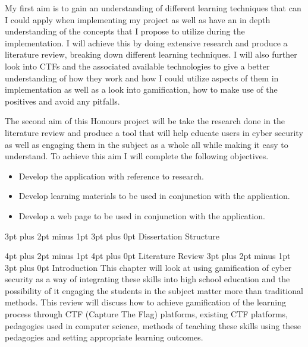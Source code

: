 \documentclass[12pt,a4paper]{article}
\makeatletter
\renewcommand\subsection{\@startsection {subsection}{1}{2mm} %
                               {3pt plus 2pt minus 1pt} %
                               {3pt plus 0pt} %
                               {\normalfont\bfseries}}
\renewcommand\section{\@startsection {section}{1}{0mm} %
                               {4pt plus 2pt minus 1pt} %
                               {4pt plus 0pt} %
                               {\bfseries}}
\makeatother
\begin{document}
My first aim is to gain an understanding of different learning techniques that can I could apply when implementing my project as well as have an in depth understanding of the concepts that I propose to utilize during the implementation. I will achieve this by doing extensive research and produce a literature review, breaking down different learning techniques. I will also further look into CTFs and the associated available technologies to give a better understanding of how they work and how I could utilize aspects of them in implementation as well as a look into gamification, how to make use of the positives and avoid any pitfalls.  

The second aim of this Honours project will be take the research done in the literature review and produce a tool that will help educate users in cyber security as well as engaging them in the subject as a whole all while making it easy to understand. To achieve this aim I will complete the following objectives. 
\begin{itemize}\itemsep0pt
	\item Develop the application with reference to research.
	\item Develop learning materials to be used in conjunction with the application.
	\item Develop a web page to be used in conjunction with the application.
\end{itemize}


\subsection{Dissertation Structure}




\section{Literature Review}
\subsection{Introduction}
This chapter will look at using gamification of cyber security as a way of integrating these skills into high school education and the possibility of it engaging the students in the subject matter more than traditional methods. This review will discuss how to achieve gamification of the learning process through CTF (Capture The Flag) platforms, existing CTF platforms, pedagogies used in computer science, methods of teaching these skills using these pedagogies and setting appropriate learning outcomes.  
\end{document}
